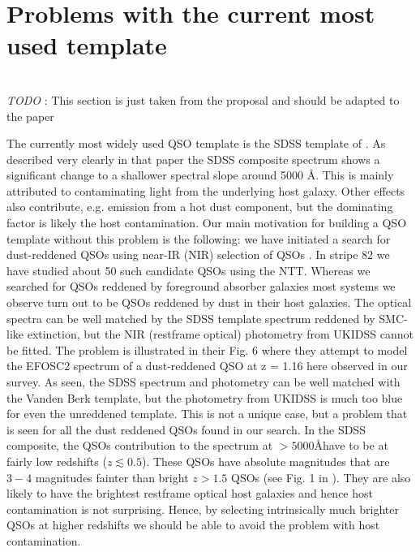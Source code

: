 \documentclass{aa}    %
\newcommand{\sectlabel}[1]{\label{sect:#1}}
\newcommand{\todo}[3]{{\color{#2}\emph{#1}: #3}}
\newcommand{\jstodo}[1]{\todo{ \\TODO }{red}{#1}}
\begin{document}
\section{Problems with the current most used template}   \sectlabel{problem}

\jstodo{This section is just taken from the proposal and should be adapted to the paper}


The currently most widely used QSO template is the SDSS template of \citep{VandenBerk2001}. As described very clearly in that paper the SDSS composite spectrum shows a significant change to a shallower spectral slope around 5000 \r{A}. This is mainly attributed to contaminating light from the underlying host galaxy. Other effects also contribute, e.g. emission from a hot dust component, but the dominating factor is likely the host contamination. Our main motivation for building a QSO template without this problem is the following: we have initiated a search for dust-reddened QSOs using near-IR (NIR) selection of QSOs \citep{Fynbo2013}. In stripe 82 we have studied about 50 such candidate QSOs using the NTT. Whereas we searched for QSOs reddened by foreground absorber galaxies most systems we observe turn out to be QSOs reddened by dust in their host galaxies. The optical spectra can be well matched by the SDSS template spectrum reddened by SMC-like extinction, but the NIR (restframe optical) photometry from UKIDSS cannot be fitted. The problem is illustrated in their Fig. 6 where they attempt to model the EFOSC2 spectrum of a dust-reddened QSO at z = 1.16 here observed in our survey. As seen, the SDSS spectrum and photometry can be well matched with the Vanden Berk template, but the photometry from UKIDSS is much too blue for even the unreddened template. This is not a unique case, but a problem that is seen for all the dust reddened QSOs found in our search.
In the SDSS composite, the QSOs contribution to the spectrum at $ > 5000$\AA have to be at fairly low redshifts ($z \lesssim  0.5$). These QSOs have absolute magnitudes that are $3-4$ magnitudes fainter than bright $z > 1.5$ QSOs (see Fig. 1 in  \cite{VandenBerk2001}). They are also likely to have the brightest restframe optical host galaxies and hence host contamination is not surprising. Hence, by selecting intrinsically much brighter QSOs at higher redshifts we should be able to avoid the problem with host contamination.
\end{document}
